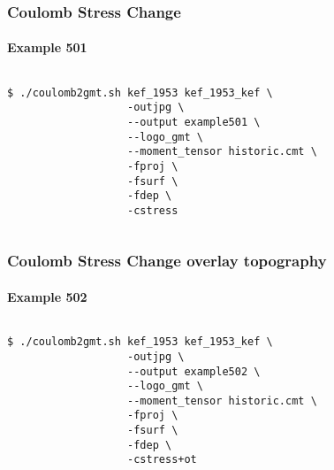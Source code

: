 \begin{frame}[t,fragile]
  \frametitle{Coulomb Stress Change}
  \framesubtitle{Example 501}
  \label{ch5fr:ex501}
\begin{columns}[t]
  \begin{column}{.5\textwidth}
\begin{scriptsize}
\begin{verbatim}
$ ./coulomb2gmt.sh kef_1953 kef_1953_kef \
                   -outjpg \ 
                   --output example501 \
                   --logo_gmt \
                   --moment_tensor historic.cmt \
                   -fproj \
                   -fsurf \
                   -fdep \
                   -cstress
\end{verbatim}
\end{scriptsize}

  \end{column}
  \begin{column}{.5\textwidth}

\centering
  \end{column}
\end{columns}

\end{frame}
\note{}

\begin{frame}[t,fragile]
  \frametitle{Coulomb Stress Change overlay topography}
  \framesubtitle{Example 502}
  \label{ch5fr:ex502}
\begin{columns}[t]
  \begin{column}{.5\textwidth}
\begin{scriptsize}
\begin{verbatim}
$ ./coulomb2gmt.sh kef_1953 kef_1953_kef \
                   -outjpg \ 
                   --output example502 \
                   --logo_gmt \
                   --moment_tensor historic.cmt \
                   -fproj \
                   -fsurf \
                   -fdep \
                   -cstress+ot
\end{verbatim}
\end{scriptsize}

  \end{column}
  \begin{column}{.5\textwidth}

\centering
  \end{column}
\end{columns}

\end{frame}
\note{}

